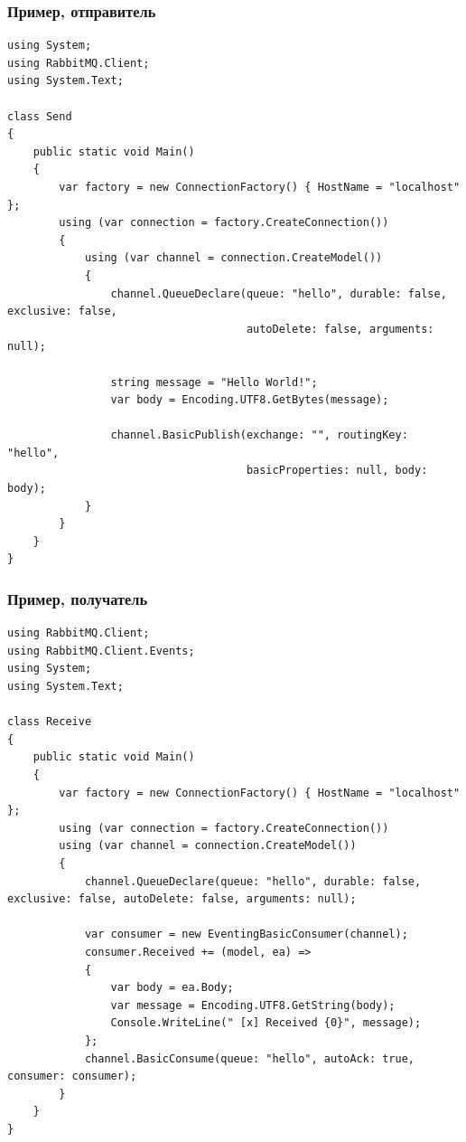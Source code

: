 \documentclass[xetex,mathserif,serif]{beamer}
\begin{document}
	\begin{frame}[fragile]
		\frametitle{Пример, отправитель}
		\begin{ssmall}
			\begin{verbatim}
using System;
using RabbitMQ.Client;
using System.Text;

class Send
{
    public static void Main()
    {
        var factory = new ConnectionFactory() { HostName = "localhost" };
        using (var connection = factory.CreateConnection())
        {
            using (var channel = connection.CreateModel())
            {
                channel.QueueDeclare(queue: "hello", durable: false, exclusive: false,
                                     autoDelete: false, arguments: null);

                string message = "Hello World!";
                var body = Encoding.UTF8.GetBytes(message);

                channel.BasicPublish(exchange: "", routingKey: "hello",
                                     basicProperties: null, body: body);
            }
        }
    }
}
			\end{verbatim}
		\end{ssmall}
	\end{frame}

	\begin{frame}[fragile]
		\frametitle{Пример, получатель}
		\begin{ssmall}
			\begin{verbatim}
using RabbitMQ.Client;
using RabbitMQ.Client.Events;
using System;
using System.Text;

class Receive
{
    public static void Main()
    {
        var factory = new ConnectionFactory() { HostName = "localhost" };
        using (var connection = factory.CreateConnection())
        using (var channel = connection.CreateModel())
        {
            channel.QueueDeclare(queue: "hello", durable: false, exclusive: false, autoDelete: false, arguments: null);

            var consumer = new EventingBasicConsumer(channel);
            consumer.Received += (model, ea) =>
            {
                var body = ea.Body;
                var message = Encoding.UTF8.GetString(body);
                Console.WriteLine(" [x] Received {0}", message);
            };
            channel.BasicConsume(queue: "hello", autoAck: true, consumer: consumer);
        }
    }
}
			\end{verbatim}
		\end{ssmall}
	\end{frame}
\end{document}
